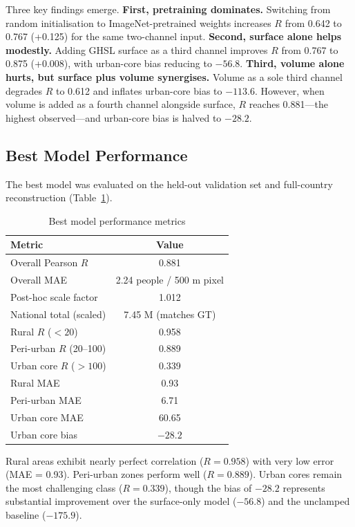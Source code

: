 \documentclass[conference]{IEEEtran}
\begin{document}
Three key findings emerge. \textbf{First, pretraining dominates.} Switching from random initialisation to ImageNet-pretrained weights increases $R$ from 0.642 to 0.767 (+0.125) for the same two-channel input. \textbf{Second, surface alone helps modestly.} Adding GHSL surface as a third channel improves $R$ from 0.767 to 0.875 (+0.008), with urban-core bias reducing to $-56.8$. \textbf{Third, volume alone hurts, but surface plus volume synergises.} Volume as a sole third channel degrades $R$ to 0.612 and inflates urban-core bias to $-113.6$. However, when volume is added as a fourth channel alongside surface, $R$ reaches 0.881---the highest observed---and urban-core bias is halved to $-28.2$.

\subsection{Best Model Performance}
\label{subsec:best}

The best model was evaluated on the held-out validation set and full-country reconstruction (Table~\ref{tab:best}).

\begin{table}[htbp]
\caption{Best model performance metrics}
\label{tab:best}
\centering
\begin{tabular}{@{}lc@{}}
\toprule
\textbf{Metric} & \textbf{Value} \\
\midrule
Overall Pearson $R$ & 0.881 \\
Overall MAE & 2.24 people / 500 m pixel \\
Post-hoc scale factor & 1.012 \\
National total (scaled) & 7.45 M (matches GT) \\
Rural $R$ ($< 20$) & 0.958 \\
Peri-urban $R$ (20--100) & 0.889 \\
Urban core $R$ ($> 100$) & 0.339 \\
Rural MAE & 0.93 \\
Peri-urban MAE & 6.71 \\
Urban core MAE & 60.65 \\
Urban core bias & $-28.2$ \\
\bottomrule
\end{tabular}
\end{table}

Rural areas exhibit nearly perfect correlation ($R = 0.958$) with very low error (MAE = 0.93). Peri-urban zones perform well ($R = 0.889$). Urban cores remain the most challenging class ($R = 0.339$), though the bias of $-28.2$ represents substantial improvement over the surface-only model ($-56.8$) and the unclamped baseline ($-175.9$).
\end{document}
